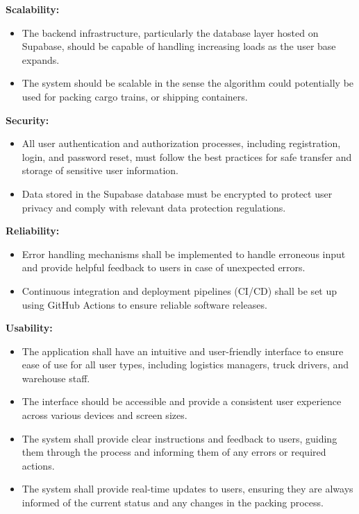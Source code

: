 \documentclass{article}
\begin{document}
\textbf{Scalability:}
\begin{itemize}
    \item The backend infrastructure, particularly the database layer hosted on Supabase, should be capable of handling increasing loads as the user base expands.
    \item The system should be scalable in the sense the algorithm could potentially be used for packing cargo trains, or shipping containers.
\end{itemize}

\textbf{Security:}
\begin{itemize}
    \item All user authentication and authorization processes, including registration, login, and password reset, must follow the best practices for safe transfer and storage of sensitive user information.
    \item Data stored in the Supabase database must be encrypted to protect user privacy and comply with relevant data protection regulations.
\end{itemize}

\textbf{Reliability:}
\begin{itemize}
    \item Error handling mechanisms shall be implemented to handle erroneous input and provide helpful feedback to users in case of unexpected errors.
    \item Continuous integration and deployment pipelines (CI/CD) shall be set up using GitHub Actions to ensure reliable software releases.
\end{itemize}

\textbf{Usability:}
\begin{itemize}
    \item The application shall have an intuitive and user-friendly interface to ensure ease of use for all user types, including logistics managers, truck drivers, and warehouse staff.
    \item The interface should be accessible and provide a consistent user experience across various devices and screen sizes.
    \item The system shall provide clear instructions and feedback to users, guiding them through the process and informing them of any errors or required actions.
    \item The system shall provide real-time updates to users, ensuring they are always informed of the current status and any changes in the packing process.
\end{itemize}
\end{document}

